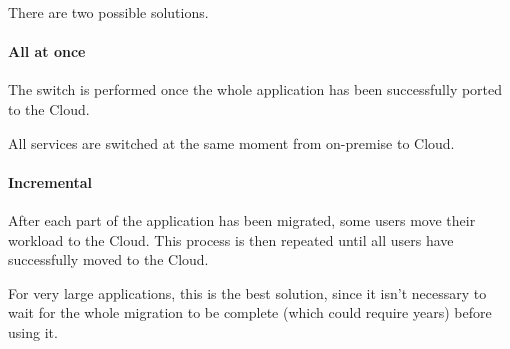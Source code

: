     There are two possible solutions.
    
    \paragraph{All at once}
        The switch is performed once the whole application has been successfully ported to the Cloud.
        
        All services are switched at the same moment from on-premise to Cloud.
        
    \paragraph{Incremental}
        After each part of the application has been migrated, some users move their workload to the Cloud.
        This process is then repeated until all users have successfully moved to the Cloud.
        
        For very large applications, this is the best solution, since it isn't necessary to wait for the whole migration to be complete (which could require years) before using it.